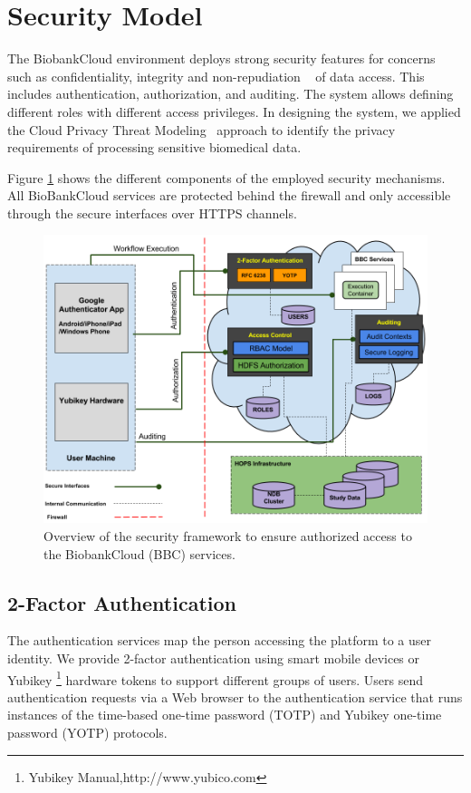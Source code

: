 \section{Security Model}

The BiobankCloud environment deploys strong security features for concerns such as confidentiality, integrity and non-repudiation ~\cite{BBCSEC} of data access. This includes authentication, authorization, and auditing. The system allows defining different roles with different access privileges. In designing the system, we applied the Cloud Privacy Threat Modeling~\cite {CPTM} approach to identify the privacy requirements of processing sensitive biomedical data.


Figure \ref{fig:security} shows the different components of the employed security mechanisms. All BioBankCloud services are protected behind the firewall and only accessible through the secure interfaces over HTTPS channels.


\begin{figure}[h]
\centering
\includegraphics[width=\textwidth]{./imgs/security.png}
\caption{Overview of the security framework to ensure authorized access to the BiobankCloud (BBC) services.}
\label{fig:security}
\end{figure}


\subsection{2-Factor Authentication}
The authentication services map the person accessing the platform to a user identity. We provide 2-factor authentication using smart mobile devices or Yubikey \footnote {Yubikey Manual,http://www.yubico.com} hardware tokens to support different groups of users. Users send authentication requests via a Web browser to the authentication service that runs instances of the time-based one-time password (TOTP) and Yubikey one-time password (YOTP) protocols.

